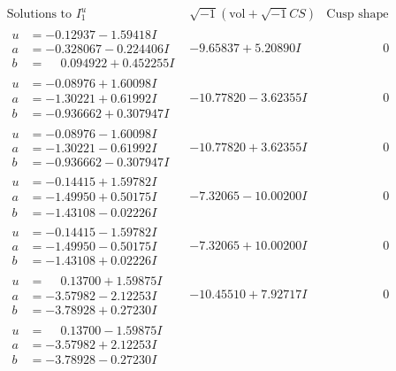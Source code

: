 \documentclass[1p]{elsarticle_modified}
\theoremstyle{definition}
\newcommand{\I}{\sqrt{-1}}
\begin{document}
$$\begin{array}{c|c|c}
\text{Solutions to }I^u_{1}& \I (\text{vol} + \sqrt{-1}CS) & \text{Cusp shape}\\
 \hline 
\begin{aligned}
u &= -0.12937 - 1.59418 I \\
a &= -0.328067 - 0.224406 I \\
b &= \phantom{-}0.094922 + 0.452255 I\end{aligned}
 & -9.65837 + 5.20890 I & \phantom{-0.000000 } 0 \\ \hline\begin{aligned}
u &= -0.08976 + 1.60098 I \\
a &= -1.30221 + 0.61992 I \\
b &= -0.936662 + 0.307947 I\end{aligned}
 & -10.77820 - 3.62355 I & \phantom{-0.000000 } 0 \\ \hline\begin{aligned}
u &= -0.08976 - 1.60098 I \\
a &= -1.30221 - 0.61992 I \\
b &= -0.936662 - 0.307947 I\end{aligned}
 & -10.77820 + 3.62355 I & \phantom{-0.000000 } 0 \\ \hline\begin{aligned}
u &= -0.14415 + 1.59782 I \\
a &= -1.49950 + 0.50175 I \\
b &= -1.43108 - 0.02226 I\end{aligned}
 & -7.32065 - 10.00200 I & \phantom{-0.000000 } 0 \\ \hline\begin{aligned}
u &= -0.14415 - 1.59782 I \\
a &= -1.49950 - 0.50175 I \\
b &= -1.43108 + 0.02226 I\end{aligned}
 & -7.32065 + 10.00200 I & \phantom{-0.000000 } 0 \\ \hline\begin{aligned}
u &= \phantom{-}0.13700 + 1.59875 I \\
a &= -3.57982 - 2.12253 I \\
b &= -3.78928 + 0.27230 I\end{aligned}
 & -10.45510 + 7.92717 I & \phantom{-0.000000 } 0 \\ \hline\begin{aligned}
u &= \phantom{-}0.13700 - 1.59875 I \\
a &= -3.57982 + 2.12253 I \\
b &= -3.78928 - 0.27230 I\end{aligned}

\end{array}$$
\end{document}
